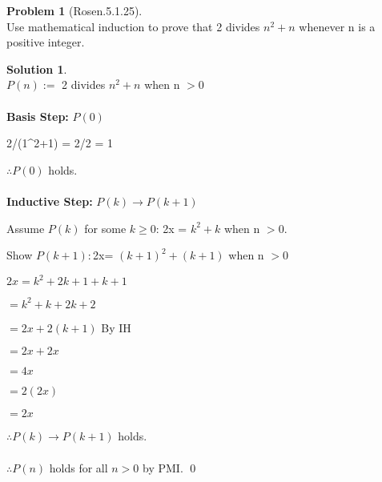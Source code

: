 \documentclass{article}
\theoremstyle{definition}
\newtheorem*{problem}{Problem}
\newtheorem*{solution}{Solution}
\begin{document}
\begin{problem}[Rosen.5.1.25]\ \\
Use mathematical induction to prove that 2 divides $n^2 + n$ whenever n is a positive integer.
\end{problem}

\begin{solution}\ \\
$P(n) :=$ 2 divides $n^2 + n$ when n $> 0$\\
\\
\textbf{Basis Step:} $P(0)$

2/(1^2+1) = 2/2 = 1

$\therefore P(0)$ holds.\\
\\
\textbf{Inductive Step:} $P(k) \to P(k+1)$

Assume $P(k)$ for some $k \geq 0$: 2x = $k^2 + k$ when n $> 0$.

Show $P(k+1):$2x= $(k+1)^2 + (k+1)$ when n $> 0$

$2x = k^2+2k+1 + k+1$

$=k^2+k+2k+2 $

$= 2x +2(k+1)$ By IH

$= 2x + 2x$

$= 4x$

$= 2(2x)$

$= 2x$

$\therefore P(k) \to P(k+1)$ holds.\\
\\
$\therefore P(n)$ holds for all $n > 0$ by PMI. \qed

\end{solution}
\end{document}
